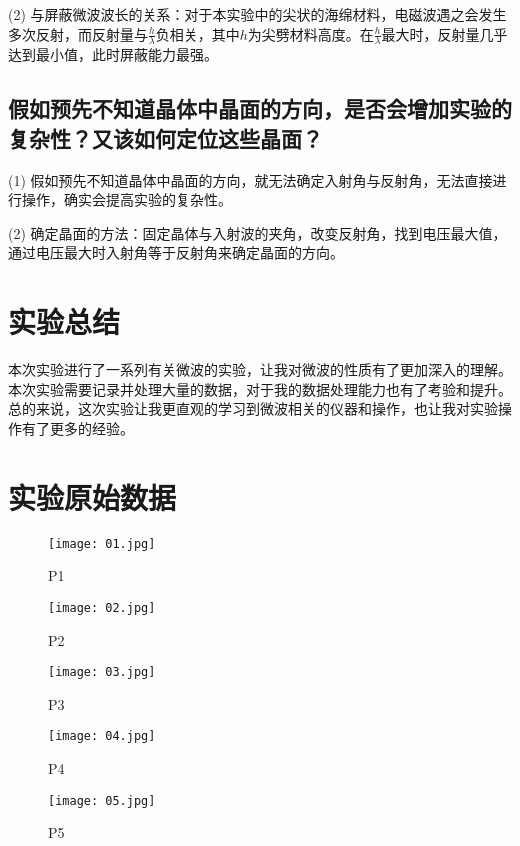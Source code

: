 \documentclass[11pt]{article}
\begin{document}
(2) 与屏蔽微波波长的关系：对于本实验中的尖状的海绵材料，电磁波遇之会发生多次反射，而反射量与$\frac{h}{\lambda}$负相关，其中$h$为尖劈材料高度。在$\frac{h}{\lambda}$最大时，反射量几乎达到最小值，此时屏蔽能力最强。

\subsection{假如预先不知道晶体中晶面的方向，是否会增加实验的复杂性？又该如何定位这些晶面？}

(1) 假如预先不知道晶体中晶面的方向，就无法确定入射角与反射角，无法直接进行操作，确实会提高实验的复杂性。

(2) 确定晶面的方法：固定晶体与入射波的夹角，改变反射角，找到电压最大值，通过电压最大时入射角等于反射角来确定晶面的方向。


\section{实验总结}

本次实验进行了一系列有关微波的实验，让我对微波的性质有了更加深入的理解。本次实验需要记录并处理大量的数据，对于我的数据处理能力也有了考验和提升。总的来说，这次实验让我更直观的学习到微波相关的仪器和操作，也让我对实验操作有了更多的经验。

\section{实验原始数据}

\begin{figure}[H]
  \centering
  \texttt{[image: 01.jpg]}
  \caption{P1}
\end{figure}

\begin{figure}[H]
  \centering
  \texttt{[image: 02.jpg]}
  \caption{P2}
\end{figure}

\begin{figure}[H]
  \centering
  \texttt{[image: 03.jpg]}
  \caption{P3}
\end{figure}

\begin{figure}[H]
  \centering
  \texttt{[image: 04.jpg]}
  \caption{P4}
\end{figure}

\begin{figure}[H]
  \centering
  \texttt{[image: 05.jpg]}
  \caption{P5}
\end{figure}
\end{document}
